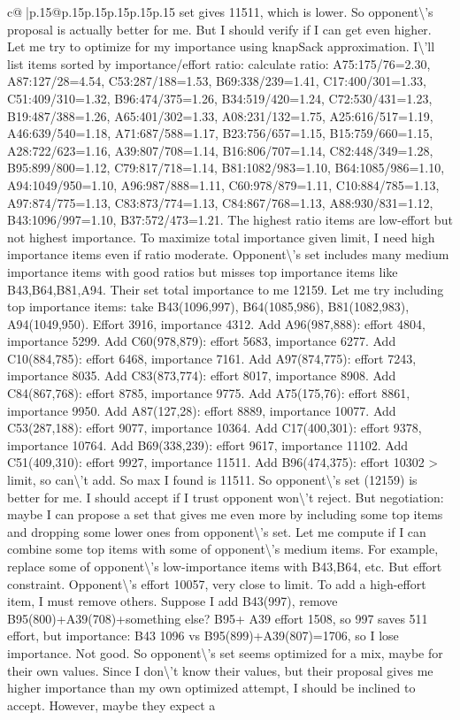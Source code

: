 \documentclass{article}
\begin{document}
{\begin{supertabular}{c@{$\;$}|p{.15\linewidth}@{}p{.15\linewidth}p{.15\linewidth}p{.15\linewidth}p{.15\linewidth}p{.15\linewidth}}
{{{set gives 11511, which is lower. So opponent\textbackslash{}'s proposal is actually better for me. But I should verify if I can get even higher. Let me try to optimize for my importance using knapSack approximation. I\textbackslash{}'ll list items sorted by importance/effort ratio: calculate ratio: A75:175/76=2.30, A87:127/28=4.54, C53:287/188=1.53, B69:338/239=1.41, C17:400/301=1.33, C51:409/310=1.32, B96:474/375=1.26, B34:519/420=1.24, C72:530/431=1.23, B19:487/388=1.26, A65:401/302=1.33, A08:231/132=1.75, A25:616/517=1.19, A46:639/540=1.18, A71:687/588=1.17, B23:756/657=1.15, B15:759/660=1.15, A28:722/623=1.16, A39:807/708=1.14, B16:806/707=1.14, C82:448/349=1.28, B95:899/800=1.12, C79:817/718=1.14, B81:1082/983=1.10, B64:1085/986=1.10, A94:1049/950=1.10, A96:987/888=1.11, C60:978/879=1.11, C10:884/785=1.13, A97:874/775=1.13, C83:873/774=1.13, C84:867/768=1.13, A88:930/831=1.12, B43:1096/997=1.10, B37:572/473=1.21. The highest ratio items are low{-}effort but not highest importance. To maximize total importance given limit, I need high importance items even if ratio moderate. Opponent\textbackslash{}'s set includes many medium importance items with good ratios but misses top importance items like B43,B64,B81,A94. Their set total importance to me 12159. Let me try including top importance items: take B43(1096,997), B64(1085,986), B81(1082,983), A94(1049,950). Effort 3916, importance 4312. Add A96(987,888): effort 4804, importance 5299. Add C60(978,879): effort 5683, importance 6277. Add C10(884,785): effort 6468, importance 7161. Add A97(874,775): effort 7243, importance 8035. Add C83(873,774): effort 8017, importance 8908. Add C84(867,768): effort 8785, importance 9775. Add A75(175,76): effort 8861, importance 9950. Add A87(127,28): effort 8889, importance 10077. Add C53(287,188): effort 9077, importance 10364. Add C17(400,301): effort 9378, importance 10764. Add B69(338,239): effort 9617, importance 11102. Add C51(409,310): effort 9927, importance 11511. Add B96(474,375): effort 10302 > limit, so can\textbackslash{}'t add. So max I found is 11511. So opponent\textbackslash{}'s set (12159) is better for me. I should accept if I trust opponent won\textbackslash{}'t reject. But negotiation: maybe I can propose a set that gives me even more by including some top items and dropping some lower ones from opponent\textbackslash{}'s set. Let me compute if I can combine some top items with some of opponent\textbackslash{}'s medium items. For example, replace some of opponent\textbackslash{}'s low{-}importance items with B43,B64, etc. But effort constraint. Opponent\textbackslash{}'s effort 10057, very close to limit. To add a high{-}effort item, I must remove others. Suppose I add B43(997), remove B95(800)+A39(708)+something else? B95+ A39 effort 1508, so 997 saves 511 effort, but importance: B43 1096 vs B95(899)+A39(807)=1706, so I lose importance. Not good. So opponent\textbackslash{}'s set seems optimized for a mix, maybe for their own values. Since I don\textbackslash{}'t know their values, but their proposal gives me higher importance than my own optimized attempt, I should be inclined to accept. However, maybe they expect a }}}
\end{supertabular}}
\end{document}
